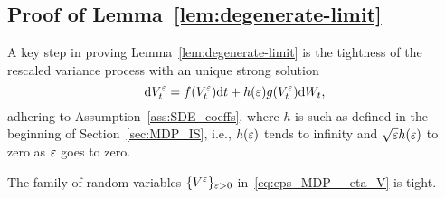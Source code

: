 \subsection{Proof of Lemma~\ref{lem:degenerate-limit}}\label{sec:lem:degenerate-limit_Proof}
A key step in proving Lemma~\ref{lem:degenerate-limit}
is the tightness of the rescaled variance process with an unique strong solution
\[
\mathrm{d} V_t^\varepsilon = f(V_t^\varepsilon)\mathrm{d} t + h(\varepsilon)g(V_t^\varepsilon)\mathrm{d} W_t,
\]
adhering to Assumption~\ref{ass:SDE_coeffs}, where $h$ is such as defined in the beginning of Section~\ref{sec:MDP_IS}, i.e., $h(\varepsilon)$ tends to infinity and $\sqrt{\varepsilon} h(\varepsilon)$ to zero as $\varepsilon$ goes to zero.
\begin{lemma}\label{lem:tightness}
The family of random variables $\{V^\varepsilon\}_{\varepsilon>0}$ in~\eqref{eq:eps_MDP__eta_V} is tight.
\end{lemma}
